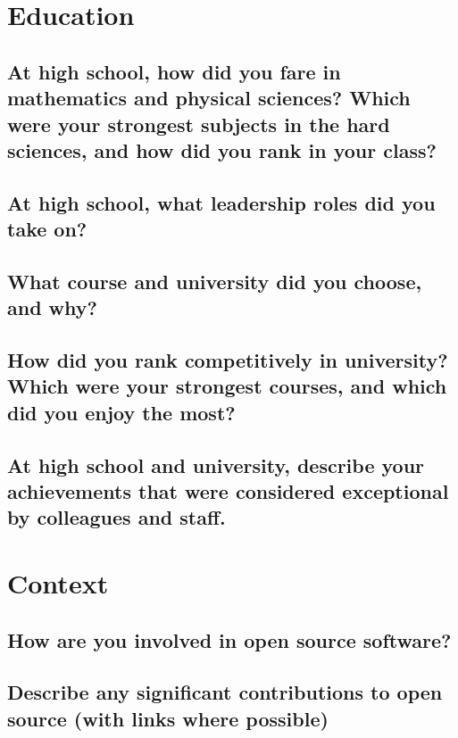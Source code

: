\documentclass{article}
\begin{document}
\section{Education}
\subsection{At high school, how did you fare in mathematics and physical sciences? Which were your strongest subjects in the hard sciences, and how did you rank in your class?}
\subsection{At high school, what leadership roles did you take on?}
\subsection{What course and university did you choose, and why?}
\subsection{How did you rank competitively in university? Which were your strongest courses, and which did you enjoy the most?}
\subsection{At high school and university, describe your achievements that were considered exceptional by colleagues and staff.}

\section{Context}
\subsection{How are you involved in open source software?}
\subsection{Describe any significant contributions to open source (with links where possible)}
\end{document}
